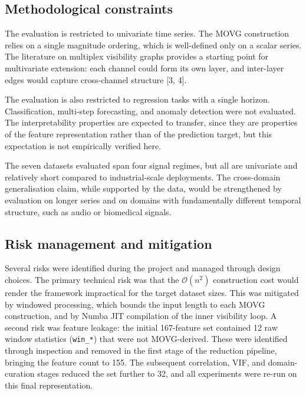 \documentclass[a4paper,12pt]{article}
\begin{document}
\subsection{Methodological constraints}
\label{sec:constr_method}

The evaluation is restricted to univariate time series. The MOVG construction relies on a single magnitude ordering, which is well-defined only on a scalar series. The literature on multiplex visibility graphs provides a starting point for multivariate extension: each channel could form its own layer, and inter-layer edges would capture cross-channel structure [3, 4].

The evaluation is also restricted to regression tasks with a single horizon. Classification, multi-step forecasting, and anomaly detection were not evaluated. The interpretability properties are expected to transfer, since they are properties of the feature representation rather than of the prediction target, but this expectation is not empirically verified here.

The seven datasets evaluated span four signal regimes, but all are univariate and relatively short compared to industrial-scale deployments. The cross-domain generalisation claim, while supported by the data, would be strengthened by evaluation on longer series and on domains with fundamentally different temporal structure, such as audio or biomedical signals.

\subsection{Risk management and mitigation}
\label{sec:constr_risk}

Several risks were identified during the project and managed through design choices. The primary technical risk was that the $\mathcal{O}(n^2)$ construction cost would render the framework impractical for the target dataset sizes. This was mitigated by windowed processing, which bounds the input length to each MOVG construction, and by Numba JIT compilation of the inner visibility loop. A second risk was feature leakage: the initial 167-feature set contained 12 raw window statistics (\texttt{win\_*}) that were not MOVG-derived. These were identified through inspection and removed in the first stage of the reduction pipeline, bringing the feature count to 155. The subsequent correlation, VIF, and domain-curation stages reduced the set further to 32, and all experiments were re-run on this final representation.
\end{document}
